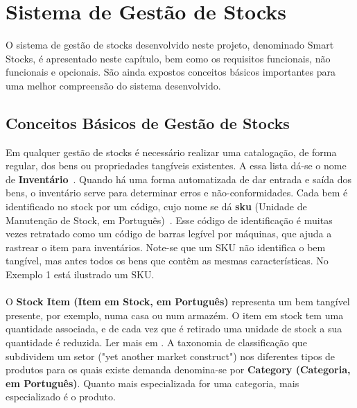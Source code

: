 %
%
\chapter{Sistema de Gestão de Stocks} \label{cap2}

O sistema de gestão de stocks desenvolvido neste projeto, denominado Smart Stocks, é apresentado neste capítulo, bem como os requisitos funcionais, não funcionais e opcionais. São ainda expostos conceitos básicos importantes para uma melhor compreensão do sistema desenvolvido.

\section{Conceitos Básicos de Gestão de Stocks} \label{sec21}
Em qualquer gestão de stocks é necessário realizar uma catalogação, de forma regular, dos bens ou propriedades tangíveis existentes. A essa lista dá-se o nome de \textbf{Inventário}~\cite{businessDictionary:invetoryDefinition2018}. Quando há uma forma automatizada de dar entrada e saída dos bens, o inventário serve para determinar erros e não-conformidades. Cada bem é identificado no stock por um código, cujo nome se dá \textbf{\acrfull{sku}} (Unidade de Manutenção de Stock, em Português)~\cite{investopedia:skuDefinition2018}. Esse código de identificação é muitas vezes retratado como um código de barras legível por máquinas, que ajuda a rastrear o item para inventários. Note-se que um SKU não identifica o bem tangível, mas antes todos os bens que contêm as mesmas características. No Exemplo 1 está ilustrado um SKU.\\[0.25cm]

\noindent{}\\[0.25cm]

O \textbf{Stock Item (Item em Stock, em Português)} \cite{sphereoi:itemIdentification2018} representa um bem tangível presente, por exemplo, numa casa ou num armazém. O item em stock tem uma quantidade associada, e de cada vez que é retirado uma unidade de stock a sua quantidade é reduzida. Ler mais em \cite{phostersoft:stockItemDefinition2018}.
A taxonomia de classificação que subdividem um setor ("yet another market construct") nos diferentes tipos de produtos para os quais existe demanda denomina-se por \textbf{Category (Categoria, em Português)}. Quanto mais especializada for uma categoria, mais especializado é o produto.

